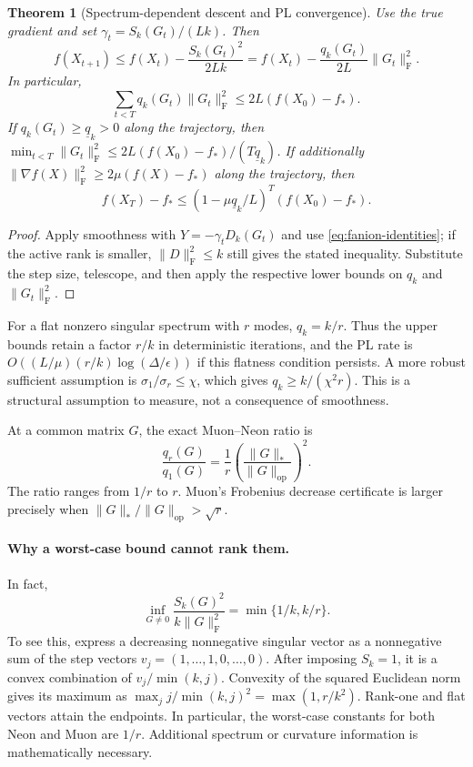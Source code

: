 \documentclass[11pt]{article}
\newtheorem{theorem}{Theorem}[section]
\newcommand{\F}[1]{\lVert #1\rVert_{\mathrm F}}
\newcommand{\nuc}[1]{\lVert #1\rVert_*}
\newcommand{\op}[1]{\lVert #1\rVert_{\mathrm{op}}}
\begin{document}
\begin{theorem}[Spectrum-dependent descent and PL convergence]\label{thm:upper}
Use the true gradient and set
$\gamma_t=S_k(G_t)/(Lk)$. Then
\begin{equation}\label{eq:spectrum-descent}
 f(X_{t+1})\leq f(X_t)-\frac{S_k(G_t)^2}{2Lk}
 =f(X_t)-\frac{q_k(G_t)}{2L}\F{G_t}^2.
\end{equation}
In particular,
\begin{equation}\label{eq:trajectory}
 \sum_{t<T}q_k(G_t)\F{G_t}^2\leq2L(f(X_0)-f_*).
\end{equation}
If $q_k(G_t)\geq\underline q_k>0$ along the trajectory, then
$\min_{t<T}\F{G_t}^2\leq2L(f(X_0)-f_*)/(T\underline q_k)$.
If additionally $\F{\nabla f(X)}^2\geq2\mu(f(X)-f_*)$ along the trajectory,
then
\begin{equation}\label{eq:pl}
 f(X_T)-f_*\leq
 (1-\mu\underline q_k/L)^T(f(X_0)-f_*).
\end{equation}
\end{theorem}
\begin{proof}
Apply smoothness with $Y=-\gamma_tD_k(G_t)$ and use
\eqref{eq:fanion-identities}; if the active rank is smaller, $\F D^2\leq k$
still gives the stated inequality. Substitute the step size, telescope, and
then apply the respective lower bounds on $q_k$ and $\F{G_t}^2$.
\end{proof}

For a flat nonzero singular spectrum with $r$ modes, $q_k=k/r$.
Thus the upper bounds retain a factor $r/k$ in deterministic iterations,
and the PL rate is $O((L/\mu)(r/k)\log(\Delta/\epsilon))$ if this
flatness condition persists. A more robust sufficient assumption is
$\sigma_1/\sigma_r\leq\chi$, which gives
$q_k\geq k/(\chi^2r)$. This is a structural assumption to measure, not a
consequence of smoothness.

At a common matrix $G$, the exact Muon--Neon ratio is
\begin{equation}\label{eq:muon-neon}
 \frac{q_r(G)}{q_1(G)}
 =\frac1r\left(\frac{\nuc G}{\op G}\right)^2.
\end{equation}
The ratio ranges from $1/r$ to $r$. Muon's Frobenius decrease certificate is
larger precisely when $\nuc G/\op G>\sqrt r$.

\paragraph{Why a worst-case bound cannot rank them.}
In fact,
\[
 \inf_{G\ne0}\frac{S_k(G)^2}{k\F G^2}
 =\min\{1/k,k/r\}.
\]
To see this, express a decreasing nonnegative singular vector as a
nonnegative sum of the step vectors $v_j=(1,\ldots,1,0,\ldots,0)$.
After imposing $S_k=1$, it is a convex combination of
$v_j/\min(k,j)$. Convexity of the squared Euclidean norm gives its maximum
as $\max_j j/\min(k,j)^2=\max(1,r/k^2)$.
Rank-one and flat vectors attain the endpoints.
In particular, the worst-case constants for both Neon and Muon are $1/r$.
Additional spectrum or curvature information is mathematically necessary.
\end{document}
